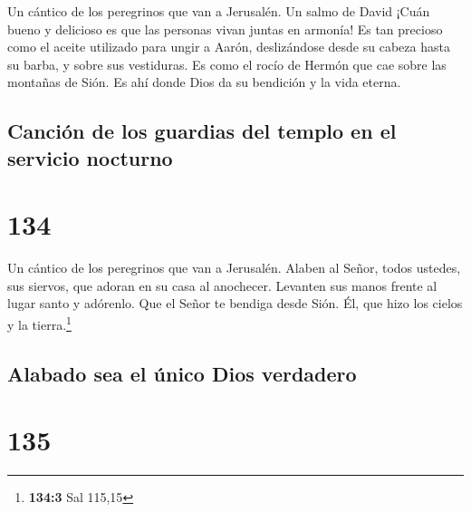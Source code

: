 Un cántico de los peregrinos que van a Jerusalén. Un salmo de David
 ¡Cuán bueno y delicioso es que las personas vivan juntas
en armonía!  Es tan precioso como el aceite utilizado para
ungir a Aarón, deslizándose desde su cabeza hasta su barba, y sobre sus
vestiduras.  Es como el rocío de Hermón que cae sobre las
montañas de Sión. Es ahí donde Dios da su bendición y la vida eterna.

\hypertarget{canciuxf3n-de-los-guardias-del-templo-en-el-servicio-nocturno}{%
\subsection{Canción de los guardias del templo en el servicio
nocturno}\label{canciuxf3n-de-los-guardias-del-templo-en-el-servicio-nocturno}}

\hypertarget{section-133}{%
\section{134}\label{section-133}}

Un cántico de los peregrinos que van a Jerusalén.  Alaben
al Señor, todos ustedes, sus siervos, que adoran en su casa al
anochecer.  Levanten sus manos frente al lugar santo y
adórenlo.  Que el Señor te bendiga desde Sión. Él, que
hizo los cielos y la tierra.\footnote{\textbf{134:3} Sal 115,15}

\hypertarget{alabado-sea-el-uxfanico-dios-verdadero}{%
\subsection{Alabado sea el único Dios
verdadero}\label{alabado-sea-el-uxfanico-dios-verdadero}}

\hypertarget{section-134}{%
\section{135}\label{section-134}}


